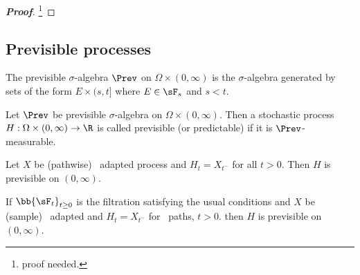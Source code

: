 \begin{proof}[\bf Proof]
\footnote{proof needed.}
\end{proof}




\subsection{Previsible processes}

\begin{definition}\label{def:previsible_sigma_algebra_without_zero}
The previsible $\sigma$-algebra $\Prev$ on $\Omega \times (0,\infty)$ is the $\sigma$-algebra generated by sets of the form $E \times(s, t]$ where $E \in \sF_s$ and $s < t$. %
\end{definition}

\begin{definition}\label{def:previsible_process_continuous_without_zero}
Let $\Prev$ be previsible $\sigma$-algebra on $\Omega \times (0,\infty)$. Then a stochastic process $H: \Omega \times (0,\infty) \to \R$ is called previsible (or predictable) if it is $\Prev$-measurable.%
\end{definition}



\begin{proposition}\label{pro:previsible}
Let $X$ be (pathwise) \cadlag\ adapted process and $H_t = X_{t^-}$ for all $t>0$. Then $H$ is previsible on $(0,\infty)$.

If $\bb{\sF_t}_{t\geq 0}$ is the filtration satisfying the usual conditions and $X$ be (sample) \cadlag\ adapted and $H_t = X_{t^-}$ for \cadlag\ paths, $t > 0$. then $H$ is previsible on $(0,\infty)$.
\end{proposition}

